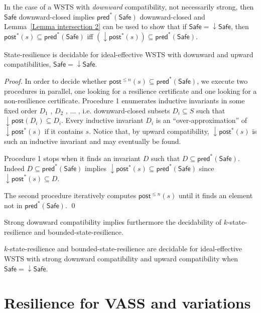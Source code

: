 \documentclass[runningheads]{llncs}
\newcommand{\pred}{\textsf{pred}}
\newcommand{\post}{\textsf{post}}
\newcommand{\Safe}{\textsf{Safe}}
\begin{document}
In the case of a WSTS with \emph{downward} compatibility, not necessarily strong,
then $\Safe$ downward-closed implies $\pred^*(\Safe)$ downward-closed and
Lemma~\ref{Lemma intersection 2} can be used to show that
if $\Safe = \downarrow \Safe$,
then
$\post^*(s)  
\subseteq \pred^*(\Safe)$  iff $ (\downarrow  \post^*(s)) 
\subseteq \pred^*(\Safe)$.


\begin{theorem}\label{downward srp}
{\sc State-resilience} is decidable for ideal-effective WSTS with downward and upward compatibilities,
$\Safe = \downarrow \Safe$.
\end{theorem}

\begin{proof}
In order to decide whether $\post^{\leq n}(s) 
 \subseteq \pred^*(\Safe)$, we execute two procedures in parallel,
one looking for a resilience certificate and one looking for a non-resilience certificate.
Procedure 1 enumerates inductive invariants in some fixed order $D_1$ , $D_2$ , $\ldots$ , i.e. downward-closed subsets $D_i \subseteq S$ such that $\downarrow \post(D_i ) \subseteq D_i$. 
Every inductive invariant $D_i$ is an “over-approximation” of $\downarrow \post^*(s)$ if it contains $s$.
Notice that, by 
upward compatibility, $\downarrow \post^*(s)$ is such an inductive invariant and may eventually be found.

Procedure 1 stops when it finds an invariant $D$ such that
$D   \subseteq \pred^*(\Safe)$. 
Indeed
$D \subseteq  \pred^*(\Safe)$ implies
$\downarrow \post^*(s)  \subseteq  \pred^*(\Safe)$
since $ \downarrow \post^*(s)  \subseteq D$.

The second procedure iteratively computes
$\post^{\leq n}(s) $
until it finds an element
not in $\pred^*(\Safe)$. \qed
\end{proof}



Strong downward compatibility implies furthermore the decidability
of {\sc $k$-state-resilience} and {\sc bounded-state-resilience}.

\begin{corollary}\label{downward brp}
{\sc $k$-state-resilience} and {\sc bounded-state-resilience} are decidable for ideal-effective WSTS with strong downward compatibility and upward compatibility when
$\Safe = \downarrow \Safe$.
\end{corollary}





\section{Resilience for VASS and variations}\label{section VASS}
\end{document}
